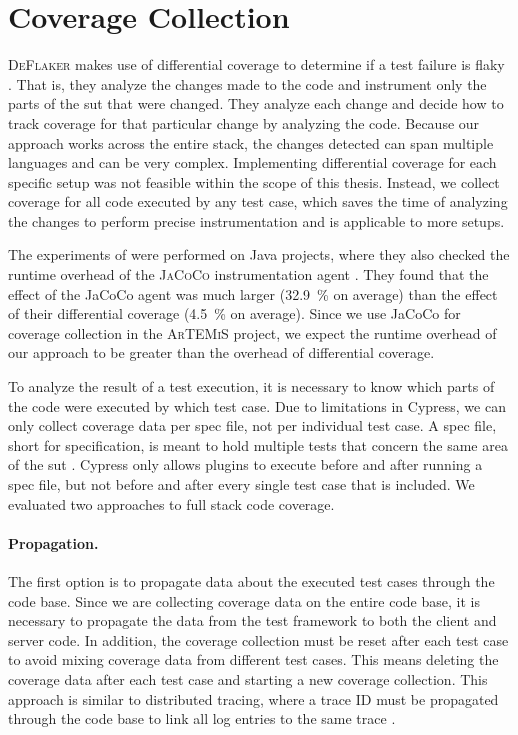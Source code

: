 \section{Coverage Collection}
\textsc{DeFlaker} makes use of differential coverage to determine if a test failure is flaky \autocite{bell_deflaker_2018}.
That is, they analyze the changes made to the code and instrument only the parts of the \ac{sut} that were changed.
They analyze each change and decide how to track coverage for that particular change by analyzing the code.
Because our approach works across the entire stack, the changes detected can span multiple languages and can be very complex.
Implementing differential coverage for each specific setup was not feasible within the scope of this thesis.
Instead, we collect coverage for all code executed by any test case, which saves the time of analyzing the changes to perform precise instrumentation and is applicable to more setups.

The experiments of \citeauthor*{bell_deflaker_2018} were performed on Java projects, where they also checked the runtime overhead of the \textsc{JaCoCo} instrumentation agent \autocite{bell_deflaker_2018}.
They found that the effect of the JaCoCo agent was much larger (\SI{32.9}{\percent} on average) than the effect of their differential coverage (\SI{4.5}{\percent} on average).
Since we use JaCoCo for coverage collection in the \textsc{ArTEMiS} project, we expect the runtime overhead of our approach to be greater than the overhead of differential coverage.

To analyze the result of a test execution, it is necessary to know which parts of the code were executed by which test case.
Due to limitations in Cypress, we can only collect coverage data per spec file, not per individual test case.
A spec file, short for specification, is meant to hold multiple tests that concern the same area of the \ac{sut} \autocite{noauthor_writing_nodate}.
Cypress only allows plugins to execute before and after running a spec file, but not before and after every single test case that is included.
We evaluated two approaches to full stack code coverage.

\paragraph{Propagation.} The first option is to propagate data about the executed test cases through the code base.
Since we are collecting coverage data on the entire code base, it is necessary to propagate the data from the test framework to both the client and server code.
In addition, the coverage collection must be reset after each test case to avoid mixing coverage data from different test cases.
This means deleting the coverage data after each test case and starting a new coverage collection.
This approach is similar to distributed tracing, where a trace ID must be propagated through the code base to link all log entries to the same trace \autocite{noauthor_distributed_nodate}.

